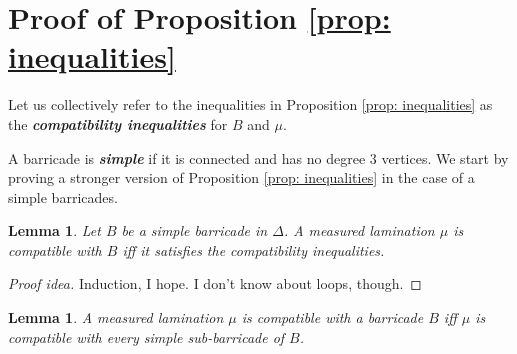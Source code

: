 \documentclass{amsart}
\newtheorem{lemma}[proposition]{Lemma}
\newtheorem{thm}[proposition]{Theorem}
\theoremstyle{definition}
\theoremstyle{remark}
\numberwithin{equation}{section}
\newcommand{\newword}[1]{\textbf{\emph{#1}}}
\newcommand{\0}{{\mathbf{0}}}
\newcommand{\M}{\mathbf{M}}
\renewcommand{\S}{\mathbf{S}}
\newenvironment{ex}{\refstepcounter{proposition}\begin{proof}[Example \emph{\thethm}]\renewcommand*{\qedsymbol}{\(\blacksquare\)}}{\end{proof}}
\begin{document}

%
%
%	
%


\section{Proof of Proposition \ref{prop: inequalities}}

Let us collectively refer to the inequalities in Proposition \ref{prop: inequalities} as the \newword{compatibility inequalities} for $B$ and $\mu$. 

A barricade is \newword{simple} if it is connected and has no degree $3$ vertices. We start by proving a stronger version of Proposition \ref{prop: inequalities} in the case of a simple barricades.

\begin{lemma}\label{lemma: simplebarricade}
Let $B$ be a simple barricade in $\Delta$. A measured lamination $\mu$ is compatible with $B$ iff it satisfies the compatibility inequalities.
\end{lemma}

\begin{proof}[Proof idea]
Induction, I hope. I don't know about loops, though.
\end{proof}
	
\begin{lemma}\label{lemma: simplesub}
A measured lamination $\mu$ is compatible with a barricade $B$ iff $\mu$ is compatible with every simple sub-barricade of $B$.
\end{lemma}
\end{document}
